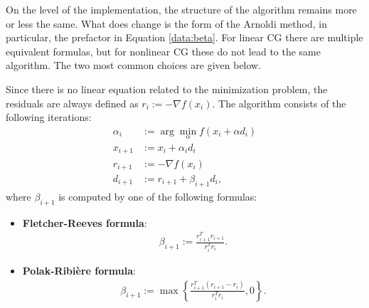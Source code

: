     On the level of the implementation, the structure of the algorithm remains more or less the same. What does change is the form of the Arnoldi method, in particular, the prefactor in Equation \eqref{data:beta}. For linear CG there are multiple equivalent formulas, but for nonlinear CG these do not lead to the same algorithm. The two most common choices are given below.
    \begin{method}[Nonlinear CG]
        Since there is no linear equation related to the minimization problem, the residuals are always defined as $r_i:=-\nabla f(x_i)$. The algorithm consists of the following iterations:
        \begin{align}
            \alpha_i &:= \arg\min_\alpha f(x_i+\alpha d_i)\label{data:argmin}\\
            x_{i+1} &:= x_i+\alpha_id_i\\
            r_{i+1} &:= -\nabla f(x_i)\\
            d_{i+1} &:= r_{i+1}+\beta_{i+1}d_i,
        \end{align}
        where $\beta_{i+1}$ is computed by one of the following formulas:
        \begin{itemize}
            \item \textbf{Fletcher-Reeves formula}:
                \begin{gather}
                    \beta_{i+1} := \frac{r_{i+1}^Tr_{i+1}}{r_i^Tr_i}.
                \end{gather}
            \item \textbf{Polak-Ribi\`ere formula}:
                \begin{gather}
                    \label{data:polak_ribiere}
                    \beta_{i+1} := \max\left\{\frac{r_{i+1}^T(r_{i+1}-r_i)}{r_i^Tr_i}, 0\right\}.
                \end{gather}
        \end{itemize}
    \end{method}

